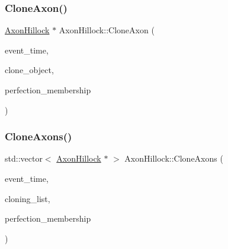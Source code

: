 \mbox{\label{classAxonHillock_ad54833cee03cfcacb5e88d174048aaa4}} 
\subsubsection{\texorpdfstring{Clone\+Axon()}{CloneAxon()}}
{\footnotesize\ttfamily \mbox{\hyperlink{classAxonHillock}{Axon\+Hillock}} $\ast$ Axon\+Hillock\+::\+Clone\+Axon (\begin{DoxyParamCaption}\item[{std\+::chrono\+::time\+\_\+point$<$ \mbox{\hyperlink{universe_8h_a0ef8d951d1ca5ab3cfaf7ab4c7a6fd80}{Clock}} $>$}]{event\+\_\+time,  }\item[{\mbox{\hyperlink{classAxonHillock}{Axon\+Hillock}} $\ast$}]{clone\+\_\+object,  }\item[{double}]{perfection\+\_\+membership }\end{DoxyParamCaption})}

\mbox{\label{classAxonHillock_aa65cead56b10bda66dc256c68764a553}} 
\subsubsection{\texorpdfstring{Clone\+Axons()}{CloneAxons()}}
{\footnotesize\ttfamily std\+::vector$<$ \mbox{\hyperlink{classAxonHillock}{Axon\+Hillock}} $\ast$ $>$ Axon\+Hillock\+::\+Clone\+Axons (\begin{DoxyParamCaption}\item[{std\+::chrono\+::time\+\_\+point$<$ \mbox{\hyperlink{universe_8h_a0ef8d951d1ca5ab3cfaf7ab4c7a6fd80}{Clock}} $>$}]{event\+\_\+time,  }\item[{std\+::vector$<$ \mbox{\hyperlink{classAxonHillock}{Axon\+Hillock}} $\ast$$>$}]{cloning\+\_\+list,  }\item[{double}]{perfection\+\_\+membership }\end{DoxyParamCaption})}

\mbox{\label{classAxonHillock_ae6b18ec6f2921b9d4461b89a9d72ab25}} 
